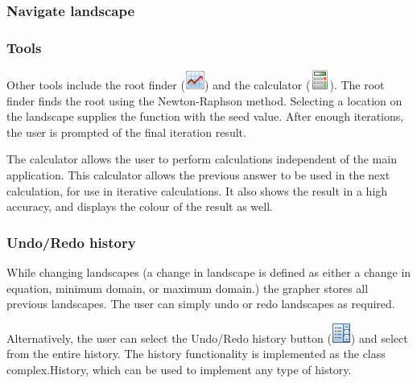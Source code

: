 \documentclass{article}
\begin{document}
			\subsubsection{Navigate landscape}
			
			\subsubsection{Tools}
				Other tools include the root finder (\includegraphics[height=\fontcharht\font`\B]{../src/resources/toolbar/newton}) and the calculator (\includegraphics[height=\fontcharht\font`\B]{../src/resources/toolbar/calculator}). The root finder finds the root using the Newton-Raphson method. Selecting a location on the landscape supplies the function with the seed value. After enough iterations, the user is prompted of the final iteration result.
				
				The calculator allows the user to perform calculations independent of the main application. This calculator allows the previous answer to be used in the next calculation, for use in iterative calculations. It also shows the result in a high accuracy, and displays the colour of the result as well.
				
			\subsubsection{Undo/Redo history}
				While changing landscapes (a change in landscape is defined as either a change in equation, minimum domain, or maximum domain.) the grapher stores all previous landscapes. The user can simply undo or redo landscapes as required. 
				
				Alternatively, the user can select the Undo/Redo history button (\includegraphics[height=\fontcharht\font`\B]{../src/resources/toolbar/history}) and select from the entire history. The history functionality is implemented as the class complex.History, which can be used to implement any type of history.
			
\end{document}

